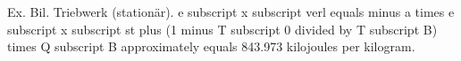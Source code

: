 Ex. Bil. Triebwerk (stationär).
e subscript x subscript verl equals minus a times e subscript x subscript st plus (1 minus T subscript 0 divided by T subscript B) times Q subscript B approximately equals 843.973 kilojoules per kilogram.